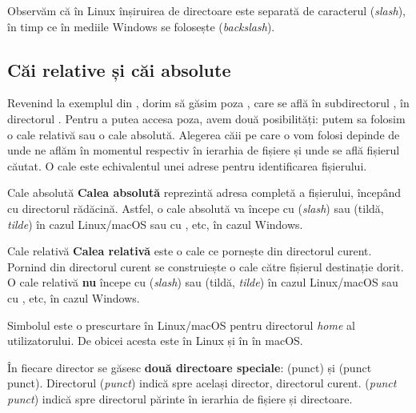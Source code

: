 Observăm că în Linux înșiruirea de directoare este separată de caracterul \file{/}
(\textit{slash}), în timp ce în mediile Windows se folosește \file{\textbackslash{}}
(\textit{backslash}).

\subsection{Căi relative și căi absolute}
\label{sec:file-system-baza-paths}

Revenind la exemplul din , dorim să găsim
poza , care se află în subdirectorul
, în directorul . Pentru a putea accesa poza, avem două
posibilități: putem sa folosim o cale relativă sau o cale absolută. Alegerea
căii pe care o vom folosi depinde de unde ne aflăm în momentul respectiv în
ierarhia de fișiere și unde se află fișierul căutat. O cale este echivalentul
unei adrese pentru identificarea fișierului.

\begin{definition}{Cale absolută}
\textbf{Calea absolută} reprezintă adresa completă a fișierului, începând cu
directorul rădăcină. Astfel, o cale absolută va începe cu \file{/} (\textit{slash}) sau
\file{\textasciitilde{}} (tildă, \textit{tilde}) în cazul Linux/macOS sau cu , 
etc, în cazul Windows.
\end{definition}

\begin{definition}{Cale relativă}
\textbf{Calea relativă} este o cale ce pornește din directorul curent. Pornind din directorul curent se construiește o cale către fișierul destinație dorit. O cale relativă \textbf{nu} începe cu \file{/} (\textit{slash}) sau
\file{\textasciitilde{}} (tildă, \textit{tilde}) în cazul Linux/macOS sau cu , 
etc, în cazul Windows.
\end{definition}

\begin{note}
Simbolul \file{\textasciitilde{}} este o prescurtare în Linux/macOS pentru directorul \textit{home} al utilizatorului. De obicei acesta este  în Linux și în  în macOS.
\end{note}

În fiecare director se găsesc \textbf{două directoare speciale}:  (punct) și  (punct punct). Directorul  (\textit{punct}) indică spre același director, directorul curent.  (\textit{punct punct}) indică spre directorul părinte în ierarhia de fișiere și directoare.


